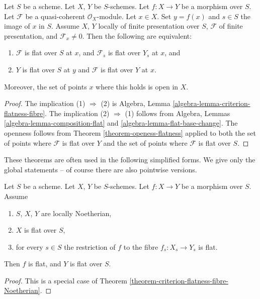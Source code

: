 \begin{theorem}
\label{theorem-criterion-flatness-fibre}
Let $S$ be a scheme. Let $X$, $Y$ be $S$-schemes.
Let $f : X \to Y$ be a morphism over $S$.
Let $\mathcal{F}$ be a quasi-coherent $\mathcal{O}_X$-module.
Let $x \in X$. Set $y = f(x)$ and $s \in S$ the image of $x$ in $S$.
Assume $X$, $Y$ locally of finite presentation over $S$,
$\mathcal{F}$ of finite presentation, and $\mathcal{F}_x \not = 0$.
Then the following are equivalent:
\begin{enumerate}
\item $\mathcal{F}$ is flat over $S$ at $x$, and
$\mathcal{F}_s$ is flat over $Y_s$ at $x$, and
\item $Y$ is flat over $S$ at $y$ and $\mathcal{F}$ is
flat over $Y$ at $x$.
\end{enumerate}
Moreover, the set of points $x$ where this holds is open in $X$.
\end{theorem}

\begin{proof}
The implication (1) $\Rightarrow$ (2) is
Algebra, Lemma \ref{algebra-lemma-criterion-flatness-fibre}.
The implication (2) $\Rightarrow$ (1) follows from
Algebra, Lemmas \ref{algebra-lemma-composition-flat}
and \ref{algebra-lemma-flat-base-change}.
The openness follows from Theorem \ref{theorem-openess-flatness}
applied to both the set of points where $\mathcal{F}$ is flat over $Y$
and the set of points where $\mathcal{F}$ is flat over $S$.
\end{proof}

\noindent
These theorems are often used in the following simplified forms.
We give only the global statements -- of course there are also pointwise
versions.

\begin{lemma}
\label{lemma-morphism-between-flat-Noetherian}
Let $S$ be a scheme.
Let $X$, $Y$ be $S$-schemes.
Let $f : X \to Y$ be a morphism over $S$.
Assume
\begin{enumerate}
\item $S$, $X$, $Y$ are locally Noetherian,
\item $X$ is flat over $S$,
\item for every $s \in S$ the restriction of $f$ to the
fibre $f_s : X_s \to Y_s$ is flat.
\end{enumerate}
Then $f$ is flat, and $Y$ is flat over $S$.
\end{lemma}

\begin{proof}
This is a special case of
Theorem \ref{theorem-criterion-flatness-fibre-Noetherian}.
\end{proof}

